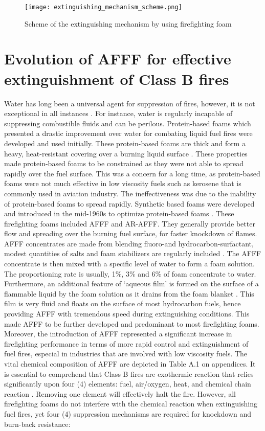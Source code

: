 \begin{figure}[H]
    \centering
    \texttt{[image: extinguishing\_mechanism\_scheme.png]}
    \caption{Scheme of the extinguishing mechanism by using firefighting foam \cite{turekova2011environmental}}
    \label{ch2:figure:scheme}
\end{figure}

\section{Evolution of AFFF for effective extinguishment of Class B fires}
Water has long been a universal agent for suppression of fires, however, it is not exceptional in all instances \cite{hinnant2020characterizing}. For instance, water is regularly incapable of suppressing combustible fluids and can be perilous. Protein-based foams which presented a drastic improvement over water for combating liquid fuel fires were developed and used initially. These protein-based foams are thick and form a heavy, heat-resistant covering over a burning liquid surface \cite{scheffey1995evaluating}. These properties made protein-based foams to be constrained as they were not able to spread rapidly over the fuel surface. This was a concern for a long time, as protein-based foams were not much effective in low viscosity fuels such as kerosene that is commonly used in aviation industry. The ineffectiveness was due to the inability of protein-based foams to spread rapidly.
Synthetic based foams were developed and introduced in the mid-1960s to optimize protein-based foams \cite{aamodt2020review} . These firefighting foams included AFFF and AR-AFFF. They generally provide better flow and spreading over the burning fuel surface, for faster knockdown of flames. AFFF concentrates are made from blending fluoro-and hydrocarbon-surfactant, modest quantities of salts and foam stabilizers are regularly included \cite{wang2019research}. The AFFF concentrate is then mixed with a specific level of water to form a foam solution. The proportioning rate is usually, 1\%, 3\% and 6\% of foam concentrate to water. Furthermore, an additional feature of ‘aqueous film’ is formed on the surface of a flammable liquid by the foam solution as it drains from the foam blanket \cite{hinnant2020characterizing}. This film is very fluid and floats on the surface of most hydrocarbon fuels, hence providing AFFF with tremendous speed during extinguishing conditions. This made AFFF to be further developed and predominant to most firefighting foams. Moreover, the introduction of AFFF represented a significant increase in firefighting performance in terms of more rapid control and extinguishment of fuel fires, especial in industries that are involved with low viscosity fuels. The vital chemical composition of AFFF are depicted in Table A.1 on appendices.
It is essential to comprehend that Class B fires are exothermic reaction that relies significantly upon four (4) elements: fuel, air/oxygen, heat, and chemical chain reaction \cite{beneventi2001role}. Removing one element will effectively halt the fire.  However, all firefighting foams do not interfere with the chemical reaction when extinguishing fuel fires, yet four (4) suppression mechanisms are required for knockdown and burn-back resistance:

